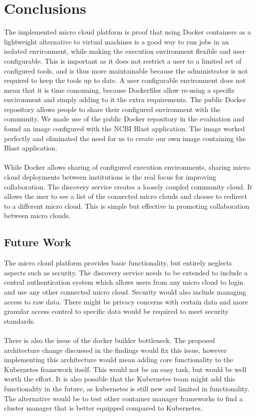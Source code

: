 \documentclass{sig-alternate-05-2015}
\begin{document}
\section{Conclusions}
The implemented micro cloud platform is proof that using Docker containers as a lightweight alternative to virtual machines is a good way to run jobs in an isolated environment, while making the execution environment flexible and user configurable. This is important as it does not restrict a user to a limited set of configured tools, and is thus more maintainable because the administrator is not required to keep the tools up to date. A user configurable environment does not mean that it is time consuming, because Dockerfiles allow re-using a specific environment and simply adding to it the extra requirements. The public Docker repository allows people to share their configured environment with the community. We made use of the public Docker repository in the evaluation and found an image configured with the NCBI Blast application. The image worked perfectly and eliminated the need for us to create our own image containing the Blast application.
\\\\
While Docker allows sharing of configured execution environments, sharing micro cloud deployments between institutions is the real focus for improving collaboration. The discovery service creates a loosely coupled community cloud. It allows the user to see a list of the connected micro clouds and choose to redirect to a different micro cloud. This is simple but effective in promoting collaboration between micro clouds.







\subsection{Future Work}
The micro cloud platform provides basic functionality, but entirely neglects aspects such as security. The discovery service needs to be extended to include a central authentication system which allows users from any micro cloud to login and use any other connected micro cloud. Security would also include managing access to raw data. There might be privacy concerns with certain data and more granular access control to specific data would be required to meet security standards.
\\\\
There is also the issue of the docker builder bottleneck. The proposed architecture change discussed in the findings would fix this issue, however implementing this architecture would mean adding core functionality to the Kubernetes framework itself. This would not be an easy task, but would be well worth the effort. It is also possible that the Kubernetes team might add this functionality in the future, as kubernetes is still new and limited in functionality. The alternative would be to test other container manager frameworks to find a cluster manager that is better equipped compared to Kubernetes.
\end{document}
